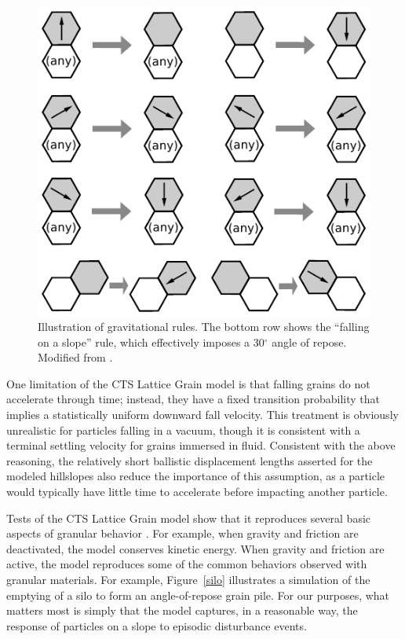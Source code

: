 \documentclass[esurf, manuscript]{copernicus}
\begin{document}
\begin{figure}[t]
\includegraphics{Figures/lattice_grain_gravity_rules.pdf}
\caption{Illustration of gravitational rules. The bottom row shows the ``falling on a slope'' rule, which effectively imposes a 30$^\circ$ angle of repose. Modified from \citet{tucker2016celllab}.}
\label{gravity}
\end{figure}

One limitation of the CTS Lattice Grain model is that falling grains do not accelerate through time; instead, they have a fixed transition probability that implies a statistically uniform downward fall velocity. This treatment is obviously unrealistic for particles falling in a vacuum, though it is consistent with a terminal settling velocity for grains immersed in fluid. Consistent with the above reasoning, the relatively short ballistic displacement lengths asserted for the modeled hillslopes also reduce the importance of this assumption, as a particle would typically have little time to accelerate before impacting another particle.

Tests of the CTS Lattice Grain model show that it reproduces several basic aspects of granular behavior \citep{tucker2016celllab}. For example, when gravity and friction are deactivated, the model conserves kinetic energy. When gravity and friction are active, the model reproduces some of the common behaviors observed with granular materials. For example, Figure~\ref{silo} illustrates a simulation of the emptying of a silo to form an angle-of-repose grain pile. For our purposes, what matters most is simply that the model captures, in a reasonable way, the response of particles on a slope to episodic disturbance events.
\end{document}

